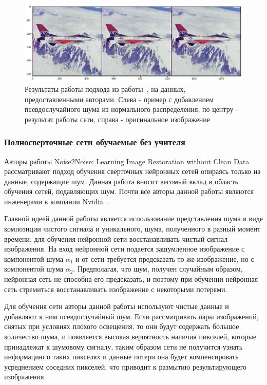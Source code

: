 \documentclass[14pt]{mmcs_article}
\begin{document}
\begin{figure}[H]
	\centering
	\includegraphics[width=\textwidth]{img/deep_prior_res}
	\caption{Результаты работы подхода из работы~\autocite{DeepPrior}, на данных, предоставленными авторами. Слева - пример с добавлением псевдослучайного шума из нормального распределения, по центру - результат работы сети, справа - оригинальное изображение}
	\label{fig:deep_prior_authors_example}
\end{figure}

\subsubsection{Полносверточные сети обучаемые без учителя}

Авторы работы Noise2Noise: Learning Image Restoration without Clean Data~\autocite{Noise2NoisePaper} рассматривают подход обучения сверточных нейронных сетей опираясь только на данные, содержащие шум. Данная работа вносит весомый вклад в область обучения сетей, подавляющих шум. Почти все авторы данной работы являются инженерами в компании Nvidia~\autocite{NvidiaTeam}. 

Главной идеей данной работы является использование представления шума в виде композиции чистого сигнала и уникального, шума, полученного в разный момент времени, для обучения нейронной сети восстанавливать чистый сигнал изображения. На вход нейронной сети подается зашумленное изображение с компонентой шума $\alpha_1$ и от сети требуется предсказать то же изображение, но с компонентой шума $\alpha_2$. Предполагая, что шум, получен случайным образом, нейронная сеть не способна его предсказать, и поэтому при обучении нейронная сеть стремиться восстанавливать изображение с некоторыми потерями.

Для обучения сети авторы данной работы используют чистые данные и добавляют к ним псевдослучайный шум. Если рассматривать пары изображений, снятых при условиях плохого освещения, то они будут содержать большое количество шума, и появляется высокая вероятность наличия пикселей, которые принадлежат к шумовому сигналу, таким образом сети не получится узнать информацию о таких пикселях и данные потери она будет компенсировать усреднением соседних пикселей, что приводит к размытию результирующего изображения.
\end{document}

